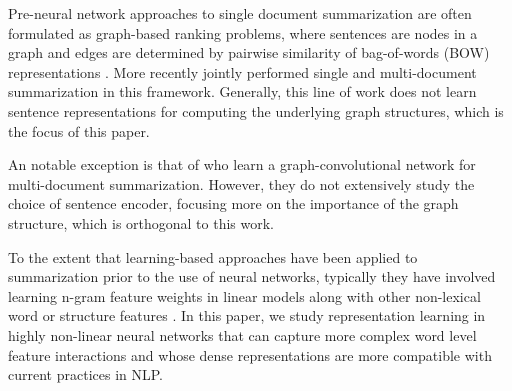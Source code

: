 
Pre-neural network
approaches to single document summarization
are often formulated as graph-based ranking problems, where
sentences are nodes in a graph and edges are determined by pairwise 
similarity of bag-of-words (BOW) representations 
\cite{erkan2004lexrank,mihalcea2005language}. 
More recently \citet{wan2010towards}
jointly performed single and multi-document summarization in this framework. 
Generally, this line of work does not learn sentence representations for 
computing the underlying graph structures, which is the focus of this paper.

An notable exception is that of
\citet{yasunaga2017graph}
who
learn a graph-convolutional network for
multi-document summarization. However, they do not extensively study the 
choice of sentence encoder, focusing more on the importance of the 
graph structure, which is orthogonal to this work.

To the extent that learning-based approaches have been applied
to summarization prior to the use of neural networks, typically they have involved learning n-gram feature weights 
in linear models along with other non-lexical word or 
structure features 
\cite{berg2011jointly,sipos2012large,durrett2016learning}.
In this paper, we study representation learning in highly non-linear
neural networks that can capture more complex word level feature interactions
and whose dense representations are more compatible with current practices
in NLP.

